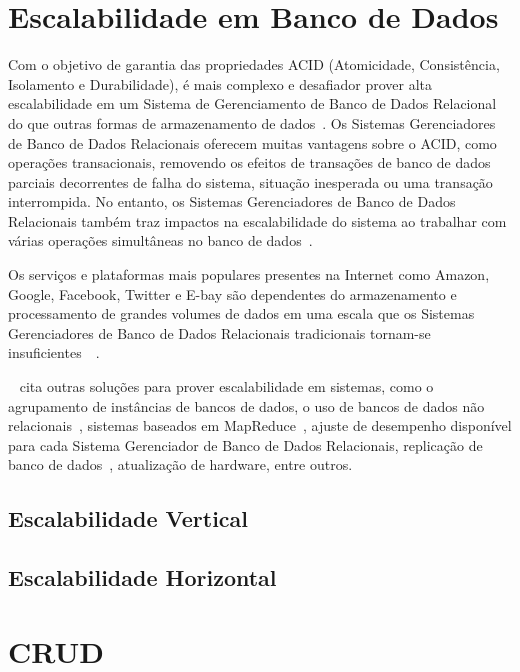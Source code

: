 \documentclass[a4paper,12pt,onecolumn,titlepage]{article}
\begin{document}
\section{Escalabilidade em Banco de Dados}
\label{sec:escalabilidade}

Com o objetivo de garantia das propriedades ACID (Atomicidade, Consistência, Isolamento e Durabilidade), é mais complexo e desafiador prover alta escalabilidade em um Sistema de Gerenciamento de Banco de Dados Relacional do que outras formas de armazenamento de dados~\citep{fisher:2011}. Os Sistemas Gerenciadores de Banco de Dados Relacionais oferecem muitas vantagens sobre o ACID, como operações transacionais, removendo os efeitos de transações de banco de dados parciais decorrentes de falha do sistema, situação inesperada ou uma transação interrompida. No entanto, os Sistemas Gerenciadores de Banco de Dados Relacionais também traz impactos na escalabilidade do sistema ao trabalhar com várias operações simultâneas no banco de dados~\citep{silva:2015}.

Os serviços e plataformas mais populares presentes na Internet como Amazon, Google, Facebook, Twitter e E-bay são dependentes do armazenamento e processamento de grandes volumes de dados em uma escala que os Sistemas Gerenciadores de Banco de Dados Relacionais tradicionais tornam-se insuficientes~\citep{pokorny:2011}~\citep{rafique:2018}.

~\cite{silva:2015} cita outras soluções para prover escalabilidade em sistemas, como o agrupamento de instâncias de bancos de dados, o uso de bancos de dados não relacionais~\citep{pokorny:2011}, sistemas baseados em MapReduce~\citep{abouzeid:2009}, ajuste de desempenho disponível para cada Sistema Gerenciador de Banco de Dados Relacionais, replicação de banco de dados~\citep{kemme:2010}, atualização de hardware, entre outros.

\subsection{Escalabilidade Vertical}
\label{subsec:vertical}

\subsection{Escalabilidade Horizontal}
\label{subsec:horizontal}

\section{CRUD}
\label{sec:crud}
\end{document}
